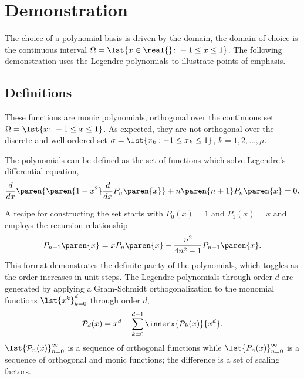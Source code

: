 \documentclass[conference]{worldcomp}
\begin{document}
\section{Demonstration}
The choice of a polynomial basis is driven by the domain, the domain of choice is the continuous interval $\Omega = \lst{x\in\real{}\colon -1 \le x \le 1}$. 
The following demonstration uses the \href{http://mathworld.wolfram.com/LegendrePolynomial.html}{Legendre polynomials} to illustrate points of emphasis. 

\subsection{Definitions}
These functions are monic polynomials, orthogonal over the continuous set $\Omega=\lst{x\colon -1 \le x \le 1}$. As expected, they are not orthogonal over the discrete and well-ordered set $\sigma = \lst{x_{k}: -1 \le x_{k} \le 1 }$, $k=1,2,\dots,\mu$.


The polynomials can be defined as the set of functions which solve Legendre's differential equation,
  \begin{equation}
    \frac{d}{dx} \paren{\paren{1-x^{2}} \frac{d}{dx} P_{n}\paren{x}} + n\paren{n+1} P_{n}\paren{x} = 0.
  \end{equation} 

A recipe for constructing the set starts with $P_{0}(x) = 1$ and $P_{1}(x) = x$ and employs the recursion relationship
  \begin{equation}
    P_{n+1}\paren{x} = x P_{n}\paren{x} - \frac{n^{2}} {4n^{2} - 1} P_{n-1}\paren{x} .
    \label{eqn:P recursion}
  \end{equation}
This format demonstrates the definite parity of the polynomials, which toggles as the order increases in unit steps. The Legendre polynomials through order $d$ are generated by applying a Gram-Schmidt orthogonalization \cite[p. 309]{Meyer} to the monomial functions $\lst{x^{k}}_{k=0}^{d}$ through order $d$,
  \begin{equation}
    \mathcal{P}_{d}(x) = x^{d} - \sum_{k=0}^{d-1} \innerx{\mathcal{P}_{k}(x)} {x^{d}} .
    \label{eqn:construction}
  \end{equation}
$\lst{\mathcal{P}_{n}(x)}_{n=0}^{\infty}$ is a sequence of orthogonal functions while $\lst{P_{n}(x)}_{n=0}^{\infty}$ is a sequence of orthogonal and monic functions; the difference is a set of scaling factors.
\end{document}
